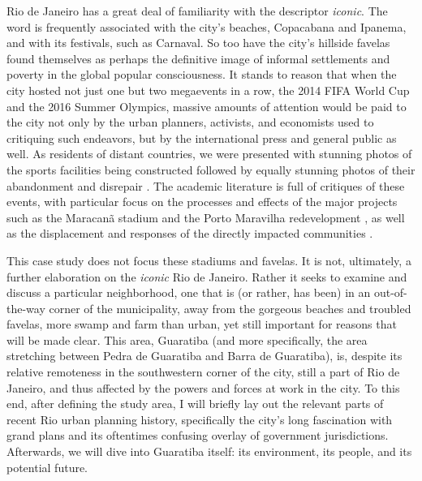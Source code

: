 Rio de Janeiro has a great deal of familiarity with the descriptor \textit{iconic}. The word is frequently associated with the city's beaches, Copacabana and Ipanema, and with its festivals, such as Carnaval. So too have the city's hillside favelas found themselves as perhaps the definitive image of informal settlements and poverty in the global popular consciousness. It stands to reason that when the city hosted not just one but two megaevents in a row, the 2014 FIFA World Cup and the 2016 Summer Olympics, massive amounts of attention would be paid to the city not only by the urban planners, activists, and economists used to critiquing such endeavors, but by the international press and general public as well. As residents of distant countries, we were presented with stunning photos of the sports facilities being constructed \cite{umlaufRioCityTransformed2016} followed by equally stunning photos of their abandonment and disrepair \cite{olivaresRioOlympicVenues2017}. The academic literature is full of critiques of these events, with particular focus on the processes and effects of the major projects such as the Maracanã stadium and the Porto Maravilha redevelopment \cite{sanchezMegaeventsUrbanRegeneration2013}, as well as the displacement and responses of the directly impacted communities  \cite{talbotHumanRightsAbuses2018,viehoffPoliticsMegaeventPlanning2016}. 

This case study does not focus these stadiums and favelas. It is not, ultimately, a further elaboration on the \textit{iconic} Rio de Janeiro. Rather it seeks to examine and discuss a particular neighborhood, one that is (or rather, has been) in an out-of-the-way corner of the municipality, away from the gorgeous beaches and troubled favelas, more swamp and farm than urban, yet still important for reasons that will be made clear. This area, Guaratiba (and more specifically, the area stretching between Pedra de Guaratiba and Barra de Guaratiba), is, despite its relative remoteness in the southwestern corner of the city, still a part of Rio de Janeiro, and thus affected by the powers and forces at work in the city. To this end, after defining the study area, I will briefly lay out the relevant parts of recent Rio urban planning history, specifically the city's long fascination with grand plans and its oftentimes confusing overlay of government jurisdictions. Afterwards, we will dive into Guaratiba itself: its environment, its people, and its potential future. 

\paragraph{} \leavevmode\newline

